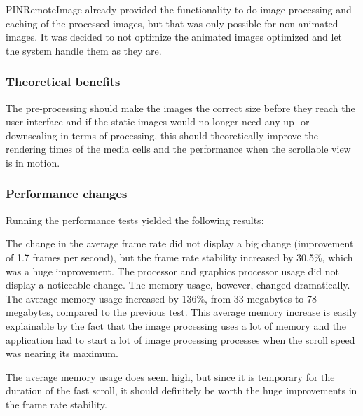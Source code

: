 \documentclass[a4paper,12pt]{article}
\begin{document}
PINRemoteImage already provided the functionality to do image processing and caching of the processed images, but that was only possible for non-animated images. It was decided to not optimize the animated images optimized and let the system handle them as they are.

\subsubsection{Theoretical benefits}
The pre-processing should make the images the correct size before they reach the user interface and if the static images would no longer need any up- or downscaling in terms of processing, this should theoretically improve the rendering times of the media cells and the performance when the scrollable view is in motion.

\subsubsection{Performance changes}
Running the performance tests yielded the following results:

The change in the average frame rate did not display a big change (improvement of 1.7 frames per second), but the frame rate stability increased by 30.5\%, which was a huge improvement. The processor and graphics processor usage did not display a noticeable change. The memory usage, however, changed dramatically. The average memory usage increased by 136\%, from 33 megabytes to 78 megabytes, compared to the previous test. This average memory increase is easily explainable by the fact that the image processing uses a lot of memory and the application had to start a lot of image processing processes when the scroll speed was nearing its maximum.

The average memory usage does seem high, but since it is temporary for the duration of the fast scroll, it should definitely be worth the huge improvements in the frame rate stability.
\end{document}
